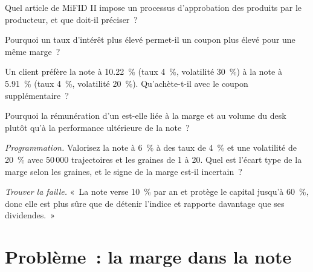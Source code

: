 \begin{exercise}[$\star$]\label{exo:in:structurer-sales-and-sales-trader:3}
Quel article de MiFID II impose un processus d'approbation des produits par le producteur, et que doit-il préciser~?
\end{exercise}

\begin{exercise}[$\star\star$]\label{exo:in:structurer-sales-and-sales-trader:4}
Pourquoi un taux d'intérêt plus élevé permet-il un coupon plus élevé pour une même marge~?
\end{exercise}

\begin{exercise}[$\star\star$]\label{exo:in:structurer-sales-and-sales-trader:5}
Un client préfère la note à 10.22~\% (taux 4~\%, volatilité 30~\%) à la note à 5.91~\% (taux 4~\%, volatilité 20~\%).
Qu'achète-t-il avec le coupon supplémentaire~?
\end{exercise}

\begin{exercise}[$\star\star$]\label{exo:in:structurer-sales-and-sales-trader:6}
Pourquoi la rémunération d'un  est-elle liée à la marge et au volume du desk plutôt qu'à la performance ultérieure de la note~?
\end{exercise}

\begin{exercise}[$\star\star\star$]\label{exo:in:structurer-sales-and-sales-trader:7}
\emph{Programmation.} Valorisez la note à 6~\% à des taux de 4~\% et une volatilité de 20~\% avec 50\,000 trajectoires et les graines de 1 à 20.
Quel est l'écart type de la marge selon les graines, et le signe de la marge est-il incertain~?
\end{exercise}

\begin{exercise}[$\star\star\star$]\label{exo:in:structurer-sales-and-sales-trader:8}
\emph{Trouver la faille.} «~La note verse 10~\% par an et protège le capital jusqu'à 60~\%, donc elle est plus sûre que de détenir
l'indice et rapporte davantage que ses dividendes.~»
\end{exercise}

\section{Problème~: la marge dans la note}


